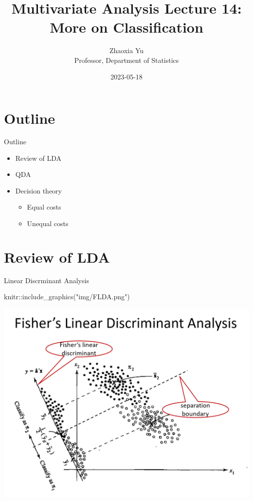\documentclass[
  ignorenonframetext,
]{beamer}
\title{Multivariate Analysis Lecture 14: More on Classification}
\author{Zhaoxia Yu\\
Professor, Department of Statistics}
\date{2023-05-18}
\newenvironment{Shaded}{\begin{snugshade}}{\end{snugshade}}
\newcommand{\FunctionTok}[1]{\textcolor[rgb]{0.00,0.00,0.00}{#1}}
\newcommand{\NormalTok}[1]{#1}
\newcommand{\SpecialCharTok}[1]{\textcolor[rgb]{0.00,0.00,0.00}{#1}}
\newcommand{\StringTok}[1]{\textcolor[rgb]{0.31,0.60,0.02}{#1}}
\providecommand{\tightlist}{%
  \setlength{\itemsep}{0pt}\setlength{\parskip}{0pt}}
\begin{document}
\frame{\titlepage}

\hypertarget{outline}{%
\section{Outline}\label{outline}}

\begin{frame}{Outline}
\begin{itemize}
\tightlist
\item
  Review of LDA
\item
  QDA
\item
  Decision theory

  \begin{itemize}
  \tightlist
  \item
    Equal costs
  \item
    Unequal costs
  \end{itemize}
\end{itemize}
\end{frame}

\hypertarget{review-of-lda}{%
\section{Review of LDA}\label{review-of-lda}}

\begin{frame}[fragile]{Linear Discrminant Analysis}
\protect\hypertarget{linear-discrminant-analysis}{}
\begin{Shaded}
\begin{Highlighting}[]
\NormalTok{knitr}\SpecialCharTok{::}\FunctionTok{include\_graphics}\NormalTok{(}\StringTok{"img/FLDA.png"}\NormalTok{)}
\end{Highlighting}
\end{Shaded}

\includegraphics[width=0.7\linewidth]{img/FLDA}
\end{frame}
\end{document}
